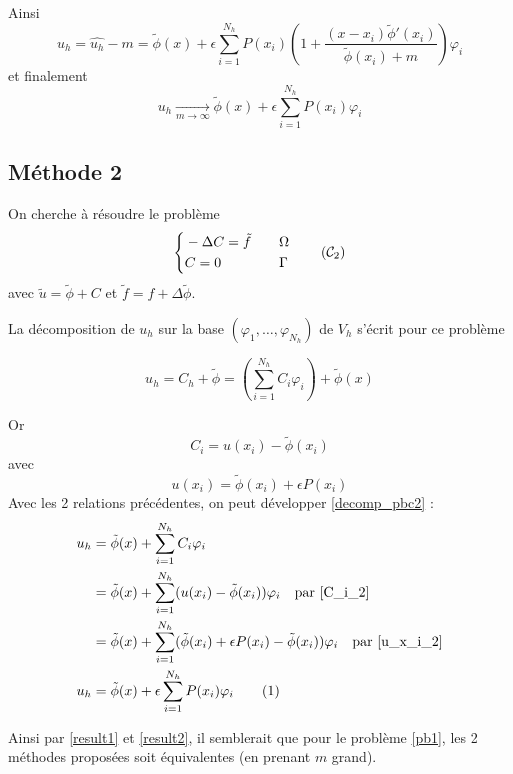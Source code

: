 \documentclass[french]{article}
\newcommand\numberthis{\addtocounter{equation}{1}\tag{\theequation}}
\begin{document}
	Ainsi
	$$u_h=\hat{u_h}-m=\tilde{\phi}(x)+\epsilon\sum_{i=1}^{N_h}P(x_i)\left(1+\frac{(x-x_i)\tilde{\phi}'(x_i)}{\tilde{\phi}(x_i)+m}\right)\varphi_i$$
	et finalement
	\begin{equation}
		u_h\xrightarrow[m\to\infty]{} \tilde{\phi}(x)+\epsilon\sum_{i=1}^{N_h}P(x_i)\varphi_i \label{result1}
	\end{equation}
	
	
	\subsection*{Méthode 2}
	
	On cherche à résoudre le problème
	\begin{equation}
		\left\{\begin{aligned}
			&-\Delta C=\tilde{f} \quad &&\Omega \\
			&C=0 \quad &&\Gamma
		\end{aligned}\right. \tag{$\mathcal{C}_2$}
	\end{equation}
	avec $\tilde{u}=\tilde{\phi}+C$ et $\tilde{f}=f+\Delta\tilde{\phi}$.
	
	La décomposition de $u_h$ sur la base $(\varphi_1,\dots,\varphi_{N_h})$ de $V_h$ s'écrit pour ce problème
	
	\begin{equation}
		u_h=C_h+\tilde{\phi}=\left(\sum_{i=1}^{N_h}C_i\varphi_i\right)+\tilde{\phi}(x) \label{decomp_pbc2}
	\end{equation}
	
	Or 
	\begin{equation}
		C_i=u(x_i)-\tilde{\phi}(x_i) \label{C_i_2}
	\end{equation}
	avec
	\begin{equation}
		u(x_i)=\tilde{\phi}(x_i)+\epsilon P(x_i) \label{u_x_i_2}
	\end{equation}
	Avec les 2 relations précédentes, on peut développer \ref{decomp_pbc2} :
	\begin{align*}
		u_h&=\tilde{\phi}(x)+\sum_{i=1}^{N_h}C_i\varphi_i \\
		&=\tilde{\phi}(x)+\sum_{i=1}^{N_h}(u(x_i)-\tilde{\phi}(x_i))\varphi_i \quad \text{par \ref{C_i_2}} \\
		&=\tilde{\phi}(x)+\sum_{i=1}^{N_h}(\tilde{\phi}(x_i)+\epsilon P(x_i)-\tilde{\phi}(x_i))\varphi_i \quad \text{par \ref{u_x_i_2}} \\
		u_h&=\tilde{\phi}(x)+\epsilon\sum_{i=1}^{N_h} P(x_i)\varphi_i \numberthis \label{result2}
	\end{align*}
	
	Ainsi par \ref{result1} et \ref{result2}, il semblerait que pour le problème \ref{pb1}, les 2 méthodes proposées soit équivalentes (en prenant $m$ grand).
\end{document}

